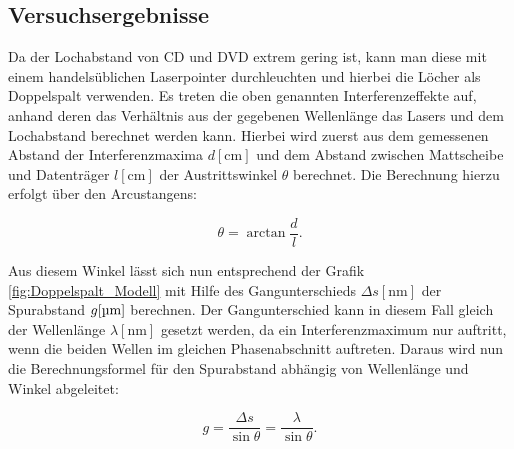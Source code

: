 \documentclass[9pt,twocolumn,twoside]{pnas-new}
\begin{document}
\subsection*{Versuchsergebnisse}
Da der Lochabstand von CD und DVD extrem gering ist, kann man diese mit einem handelsüblichen Laserpointer durchleuchten und hierbei die Löcher als Doppelspalt verwenden. Es treten die oben genannten Interferenzeffekte auf, anhand deren das Verhältnis aus der gegebenen Wellenlänge das Lasers und dem  Lochabstand berechnet werden kann. Hierbei wird zuerst aus dem gemessenen Abstand der Interferenzmaxima \begin{math}d[\mbox{cm}]\end{math} und dem Abstand zwischen Mattscheibe und Datenträger \begin{math}l[\mbox{cm}]\end{math} der Austrittswinkel \begin{math}\theta\end{math} berechnet. Die Berechnung hierzu erfolgt über den Arcustangens:

\begin{equation}
\label{eq:Theta_Berechnung}
\theta=\arctan\frac{d}{l}.
\end{equation}

Aus diesem Winkel lässt sich nun entsprechend der Grafik \ref{fig:Doppelspalt_Modell} mit Hilfe des Gangunterschieds \begin{math}\Delta s[\mbox{nm}]\end{math} der Spurabstand \begin{math}g[\mbox{\textmu m}]\end{math} berechnen. Der Gangunterschied kann in diesem Fall gleich der Wellenlänge \begin{math}\lambda[\mbox{nm}]\end{math} gesetzt werden, da ein Interferenzmaximum nur auftritt, wenn die beiden Wellen im gleichen Phasenabschnitt auftreten. Daraus wird nun die Berechnungsformel für den Spurabstand abhängig von Wellenlänge und Winkel abgeleitet:

\begin{equation}
\label{eq:Spurabstand_Sinus}
 g= \frac{\Delta s}{\sin\theta}= \frac{\lambda}{\sin\theta}.
\end{equation}
\end{document}
